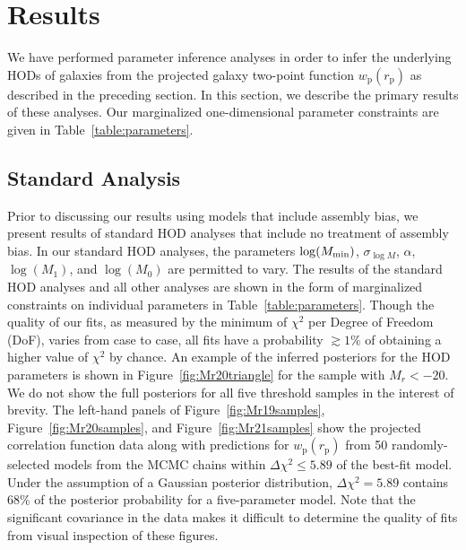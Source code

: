 \documentclass[usenatbib,usegraphicx,letterpaper]{mn2e}
\newcommand{\wprp}{w_{\mathrm{p}}}
\newcommand{\rp}{r_{\mathrm{p}}}
\newcommand{\magr}{M_r}
\begin{document}
\section{Results}
\label{section:results}

We have performed parameter inference analyses in order to infer the underlying HODs of
galaxies from the projected galaxy two-point function $\wprp(\rp)$ as described in the preceding
section. In this section, we describe the primary results of these analyses. Our marginalized
one-dimensional parameter constraints are given in Table~\ref{table:parameters}.

\subsection{Standard Analysis}
\label{subsection:standard}

Prior to discussing our results using models that include assembly bias, we present
results of standard HOD analyses that include no treatment of assembly bias. 
In our standard HOD analyses, the parameters $\log (M_{\rm min})$,
$\sigma_{\log M}$, $\alpha$, $\log (M_1)$, and $\log (M_0)$ are permitted to vary. 
The results of the standard HOD analyses and all other analyses are shown in the form of 
marginalized constraints on individual parameters in Table~\ref{table:parameters}. Though the quality of 
our fits, as measured by the minimum of $\chi^2$ per Degree of Freedom (DoF), varies from case to case, 
all fits have a probability $\gtrsim 1\% $ of obtaining a higher value of $\chi^2$ by chance. 
An example of the inferred posteriors for the HOD parameters is shown in 
Figure~\ref{fig:Mr20triangle} for the sample with $\magr < -20$. We do 
not show the full posteriors for all five threshold samples in the interest of brevity.
The left-hand panels of Figure~\ref{fig:Mr19samples}, Figure~\ref{fig:Mr20samples}, and Figure~\ref{fig:Mr21samples}
show the projected correlation function data along with predictions for $\wprp(\rp)$ from 50 randomly-selected
models from the MCMC chains within $\Delta \chi^2 \le 5.89$ of the best-fit model. Under the assumption of 
a Gaussian posterior distribution, $\Delta \chi^2 = 5.89$ contains 68\% of the posterior probability for a 
five-parameter model. Note that the significant covariance in the data makes it difficult to
determine the quality of fits from visual inspection of these figures.
\end{document}
